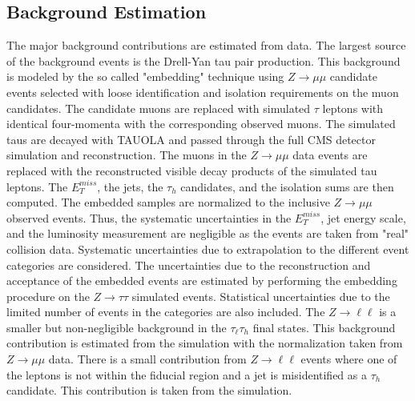 \subsection{Background Estimation}

The major background contributions are estimated from data. The largest source of the background events is the Drell-Yan tau pair production. This background is modeled by the so called "embedding" technique using $Z \rightarrow \mu\mu$ candidate events selected with loose identification and isolation requirements on the muon candidates.  The candidate muons are replaced with simulated $\tau$ leptons with identical four-momenta with the corresponding observed muons.  The simulated taus are decayed with TAUOLA and passed through the full CMS detector simulation and reconstruction. The muons in the $Z \rightarrow \mu\mu$ data events are replaced with the reconstructed visible decay products of the simulated tau leptons. The $E_{T}^{miss}$, the jets, the $\tau_h$ candidates, and the isolation sums are then computed. The embedded samples are normalized to the inclusive $Z\rightarrow \mu\mu$ observed events.  Thus, the systematic uncertainties in the $E_{T}^{miss}$, jet energy scale, and the luminosity measurement are negligible as the events are taken from "real" collision data. Systematic uncertainties due to extrapolation to the different event categories are considered. The uncertainties due to the reconstruction and acceptance of the embedded events are estimated by performing the embedding procedure on the $Z\rightarrow\tau\tau$ simulated events. Statistical uncertainties due to the limited number of events in the categories are also included.  The $Z\rightarrow \ell\ell$ is a smaller but non-negligible background in the $\tau_{\ell}\tau_h$ final states. This background contribution is estimated from the simulation with the normalization taken from $Z\rightarrow\mu\mu$ data. There is a small contribution from $Z\rightarrow \ell\ell$ events where one of the leptons is not within the fiducial region and a jet is misidentified as a $\tau_h$ candidate. This contribution is taken from the simulation.  

